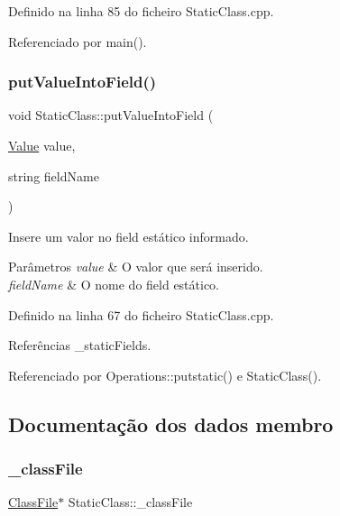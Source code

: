 Definido na linha 85 do ficheiro Static\+Class.\+cpp.



Referenciado por main().

\mbox{\label{classStaticClass_a010cf8cd301416ef4408c066e0fbcda6}} 
\subsubsection{\texorpdfstring{put\+Value\+Into\+Field()}{putValueIntoField()}}
{\footnotesize\ttfamily void Static\+Class\+::put\+Value\+Into\+Field (\begin{DoxyParamCaption}\item[{\hyperlink{structValue}{Value}}]{value,  }\item[{string}]{field\+Name }\end{DoxyParamCaption})}



Insere um valor no field estático informado. 


\begin{DoxyParams}{Parâmetros}
{\em value} & O valor que será inserido. \\
\hline
{\em field\+Name} & O nome do field estático. \\
\hline
\end{DoxyParams}


Definido na linha 67 do ficheiro Static\+Class.\+cpp.



Referências \+\_\+static\+Fields.



Referenciado por Operations\+::putstatic() e Static\+Class().



\subsection{Documentação dos dados membro}
\mbox{\label{classStaticClass_ae54948d5ec18075dd5b68c7faf4ccc8b}} 
\subsubsection{\texorpdfstring{\+\_\+class\+File}{\_classFile}}
{\footnotesize\ttfamily \hyperlink{classClassFile}{Class\+File}$\ast$ Static\+Class\+::\+\_\+class\+File\hspace{0.3cm}{\ttfamily [private]}}

